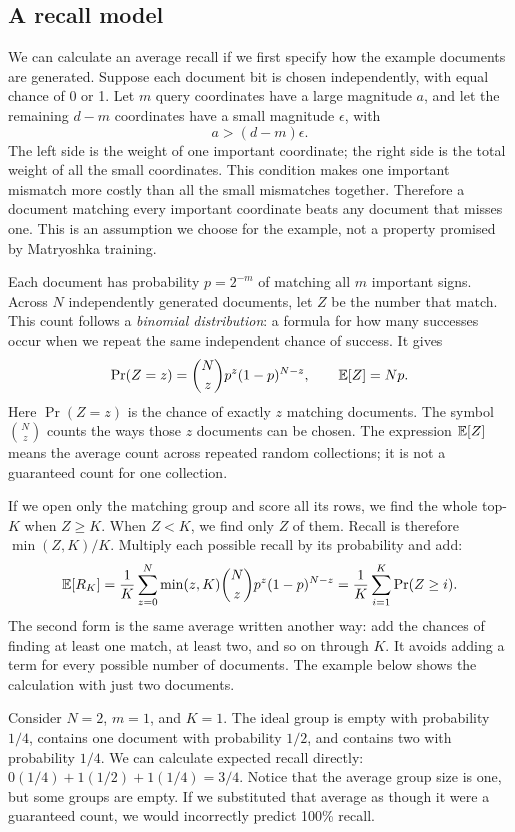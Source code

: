 \subsection{A recall model}
We can calculate an average recall if we first specify how the example documents are generated.
Suppose each document bit is chosen independently, with equal chance of 0 or 1. Let $m$ query coordinates have a large magnitude $a$, and let the remaining $d-m$ coordinates
have a small magnitude $\epsilon$, with
\begin{equation}
a>(d-m)\epsilon.
\label{eq:dominance}
\end{equation}
The left side is the weight of one important coordinate; the right side is the total weight
of all the small coordinates. This condition makes one important mismatch more costly than
all the small mismatches together. Therefore a document matching every important coordinate
beats any document that misses one. This is an assumption we choose for the example, not a
property promised by Matryoshka training.

Each document has probability $p=2^{-m}$ of matching all $m$ important signs. Across $N$
independently generated documents, let $Z$ be the number that match. This count follows a
\emph{binomial distribution}: a formula for how many successes occur when we repeat the same
independent chance of success. It gives
\[
\Pr(Z=z)=\binom Nz p^z(1-p)^{N-z},\qquad \mathbb E[Z]=Np.
\]
Here $\Pr(Z=z)$ is the chance of exactly $z$ matching documents. The symbol $\binom Nz$
counts the ways those $z$ documents can be chosen. The expression $\mathbb E[Z]$ means the average
count across repeated random collections; it is not a guaranteed count for one collection.

If we open only the matching group and score all its rows, we find the whole top-$K$ when
$Z\ge K$. When $Z<K$, we find only $Z$ of them. Recall is therefore $\min(Z,K)/K$.
Multiply each possible recall by its probability and add:
\begin{equation}
\mathbb E[R_K]=\frac1K\sum_{z=0}^{N}\min(z,K)\binom Nz p^z(1-p)^{N-z}
       =\frac1K\sum_{i=1}^{K}\Pr(Z\ge i).
\label{eq:binomial-recall}
\end{equation}
The second form is the same average written another way: add the chances of finding at least
one match, at least two, and so on through $K$. It avoids adding a term for every possible
number of documents. The example below shows the calculation with just two documents.

Consider $N=2$, $m=1$, and $K=1$. The ideal group is empty with probability $1/4$, contains
one document with probability $1/2$, and contains two with probability $1/4$. We can calculate
expected recall directly: $0(1/4)+1(1/2)+1(1/4)=3/4$. Notice that the average group size is
one, but some groups are empty. If we substituted that average as though it were a guaranteed
count, we would incorrectly predict 100\% recall.


